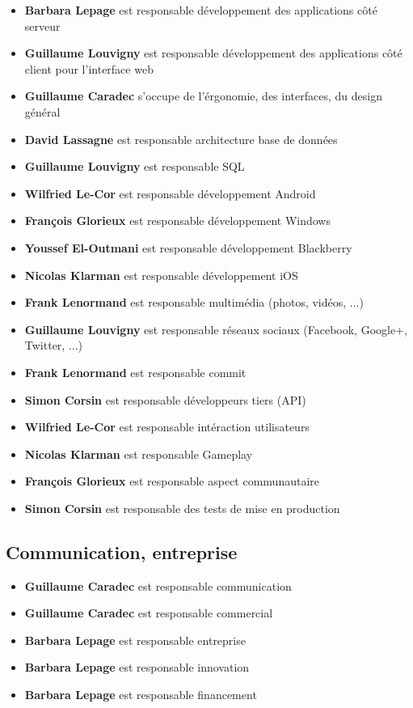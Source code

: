 \documentclass{life-fr}
\begin{document}
\begin{itemize}
  \item \textbf{Barbara Lepage} est responsable développement des applications côté
    serveur
  \item \textbf{Guillaume Louvigny} est responsable développement des
    applications côté client pour l'interface web
  \item \textbf{Guillaume Caradec} s'occupe de l'érgonomie, des interfaces, du
    design général
  \item \textbf{David Lassagne} est responsable architecture base de données
  \item \textbf{Guillaume Louvigny} est responsable SQL
  \item \textbf{Wilfried Le-Cor} est responsable développement Android
  \item \textbf{François Glorieux} est responsable développement Windows
  \item \textbf{Youssef El-Outmani} est responsable développement Blackberry
  \item \textbf{Nicolas Klarman} est responsable développement iOS
  \item \textbf{Frank Lenormand} est responsable multimédia (photos, vidéos, ...)
  \item \textbf{Guillaume Louvigny} est responsable réseaux sociaux (Facebook,
    Google+, Twitter, ...)
  \item \textbf{Frank Lenormand} est responsable commit
  \item \textbf{Simon Corsin} est responsable développeurs tiers (API)
  \item \textbf{Wilfried Le-Cor} est responsable intéraction utilisateurs
  \item \textbf{Nicolas Klarman} est responsable Gameplay
  \item \textbf{François Glorieux} est responsable aspect communautaire
  \item \textbf{Simon Corsin} est responsable des tests de mise en production
\end{itemize}

\subsection{ Communication, entreprise}

\begin{itemize}
  \item \textbf{Guillaume Caradec} est responsable communication
  \item \textbf{Guillaume Caradec} est responsable commercial
  \item \textbf{Barbara Lepage} est responsable entreprise
  \item \textbf{Barbara Lepage} est responsable innovation
  \item \textbf{Barbara Lepage} est responsable financement
\end{itemize}
\end{document}
